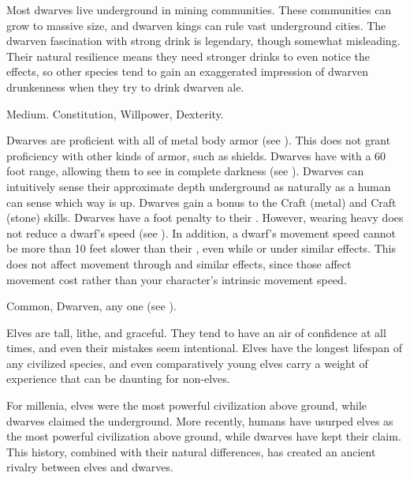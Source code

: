   Most dwarves live underground in mining communities.
  These communities can grow to massive size, and dwarven kings can rule vast underground cities.
  The dwarven fascination with strong drink is legendary, though somewhat misleading.
  Their natural resilience means they need stronger drinks to even notice the effects, so other species tend to gain an exaggerated impression of dwarven drunkenness when they try to drink dwarven ale.

   Medium.
    Constitution,  Willpower,  Dexterity.
  \begin{raggeditemize}
     Dwarves are proficient with all  of metal body armor (see ).
      This does not grant proficiency with other kinds of armor, such as shields.
     Dwarves have  with a 60 foot range, allowing them to see in complete darkness (see ).
     Dwarves can intuitively sense their approximate depth underground as naturally as a human can sense which way is up.
     Dwarves gain a  bonus to the Craft (metal) and Craft (stone) skills.
     Dwarves have a  foot penalty to their .
      However, wearing heavy  does not reduce a dwarf's speed (see ).
      In addition, a dwarf's movement speed cannot be more than 10 feet slower than their , even while \slowed or under similar effects.
      This does not affect movement through  and similar effects, since those affect movement cost rather than your character's intrinsic movement speed.
  \end{raggeditemize}
   Common, Dwarven, any one  (see ).


  Elves are tall, lithe, and graceful.
  They tend to have an air of confidence at all times, and even their mistakes seem intentional.
  Elves have the longest lifespan of any civilized species, and even comparatively young elves carry a weight of experience that can be daunting for non-elves.

  For millenia, elves were the most powerful civilization above ground, while dwarves claimed the underground.
  More recently, humans have usurped elves as the most powerful civilization above ground, while dwarves have kept their claim.
  This history, combined with their natural differences, has created an ancient rivalry between elves and dwarves.


